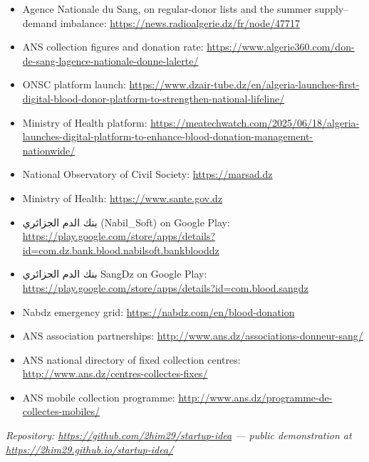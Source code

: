 \documentclass[11pt,a4paper]{article}
\newcommand{\ar}[1]{\textarabic{#1}}
\newcommand{\note}[1]{{\small\color{qatraGrey}\textit{#1}}}
\begin{document}
\begin{itemize}[leftmargin=1.4em]\small
  \item Agence Nationale du Sang, on regular-donor lists and the summer
        supply–demand imbalance: \url{https://news.radioalgerie.dz/fr/node/47717}
  \item ANS collection figures and donation rate:
        \url{https://www.algerie360.com/don-de-sang-lagence-nationale-donne-lalerte/}
  \item ONSC platform launch:
        \url{https://www.dzair-tube.dz/en/algeria-launches-first-digital-blood-donor-platform-to-strengthen-national-lifeline/}
  \item Ministry of Health platform:
        \url{https://meatechwatch.com/2025/06/18/algeria-launches-digital-platform-to-enhance-blood-donation-management-nationwide/}
  \item National Observatory of Civil Society: \url{https://marsad.dz}
  \item Ministry of Health: \url{https://www.sante.gov.dz}
  \item \ar{بنك الدم الجزائري} (Nabil\_Soft) on Google Play:
        \url{https://play.google.com/store/apps/details?id=com.dz.bank.blood.nabilsoft.bankblooddz}
  \item \ar{بنك الدم الجزائري} SangDz on Google Play:
        \url{https://play.google.com/store/apps/details?id=com.blood.sangdz}
  \item Nabdz emergency grid: \url{https://nabdz.com/en/blood-donation}
  \item ANS association partnerships:
        \url{http://www.ans.dz/associations-donneur-sang/}
  \item ANS national directory of fixed collection centres:
        \url{http://www.ans.dz/centres-collectes-fixes/}
  \item ANS mobile collection programme:
        \url{http://www.ans.dz/programme-de-collectes-mobiles/}
\end{itemize}

\vfill
\note{Repository: \url{https://github.com/2him29/startup-idea} — public
demonstration at \url{https://2him29.github.io/startup-idea/}}
\end{document}
